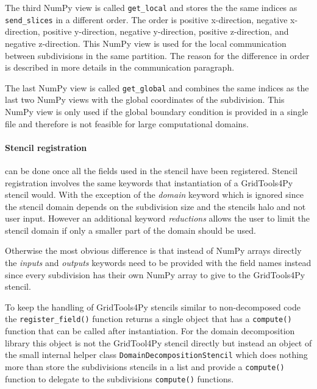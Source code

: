 The third NumPy view is called \texttt{get\_local} and stores the the same indices as \texttt{send\_slices} in a different order.
The order is positive x-direction, negative x-direction, positive y-direction, negative y-direction, positive z-direction, and negative z-direction.
This NumPy view is used for the local communication between subdivisions in the same partition.
The reason for the difference in order is described in more details in the communication paragraph.

The last NumPy view is called \texttt{get\_global} and combines the same indices as the last two NumPy views with the global coordinates of the subdivision.
This NumPy view is only used if the global boundary condition is provided in a single file and therefore is not feasible for large computational domains.


\paragraph{Stencil registration } can be done once all the fields used in the stencil have been registered.
Stencil registration involves the same keywords that instantiation of a GridTools4Py stencil would.
With the exception of the \textit{domain} keyword which is ignored since the stencil domain depends on the subdivision size and the stencils halo and not user input.
However an additional keyword \textit{reductions} allows the user to limit the stencil domain if only a smaller part of the domain should be used.

Otherwise the most obvious difference is that instead of NumPy arrays directly the \textit{inputs} and \textit{outputs} keywords need to be provided with the field names instead since every subdivision has their own NumPy array to give to the GridTools4Py stencil.

To keep the handling of GridTools4Py stencils similar to non-decomposed code the \texttt{register\_field()} function returns a single object that has a \texttt{compute()} function that can be called after instantiation.
For the domain decomposition library this object is not the GridTool4Py stencil directly but instead an object of the small internal helper class \texttt{DomainDecompositionStencil} which does nothing more than store the subdivisions stencils in a list and provide a \texttt{compute()} function to delegate to the subdivisions \texttt{compute()} functions.

